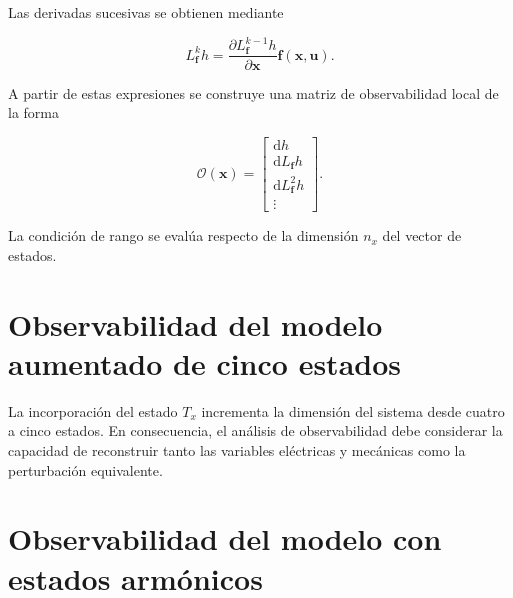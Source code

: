 Las derivadas sucesivas se obtienen mediante

\begin{equation}
    L_{\mathbf{f}}^{k}h =
    \frac{\partial L_{\mathbf{f}}^{k-1}h}
    {\partial \mathbf{x}}
    \mathbf{f}(\mathbf{x},\mathbf{u}).
\end{equation}

A partir de estas expresiones se construye una matriz de observabilidad
local de la forma

\begin{equation}
    \mathcal{O}(\mathbf{x}) =
    \begin{bmatrix}
        \mathrm{d}h \\
        \mathrm{d}L_{\mathbf{f}}h \\
        \mathrm{d}L_{\mathbf{f}}^{2}h \\
        \vdots
    \end{bmatrix}.
\end{equation}

La condición de rango se evalúa respecto de la dimensión $n_x$ del
vector de estados.

%


\section{Observabilidad del modelo aumentado de cinco estados}
\label{anexo:observabilidad_5}

La incorporación del estado $T_x$ incrementa la dimensión del sistema
desde cuatro a cinco estados. En consecuencia, el análisis de
observabilidad debe considerar la capacidad de reconstruir tanto las
variables eléctricas y mecánicas como la perturbación equivalente.

%
%
%
%


\section{Observabilidad del modelo con estados armónicos}
\label{anexo:observabilidad_armonica}

